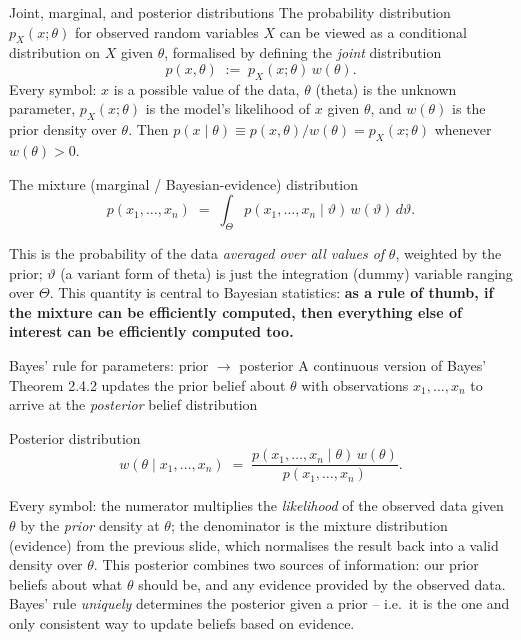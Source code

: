 \documentclass[aspectratio=169,10pt]{beamer}
\begin{document}
\begin{frame}{Joint, marginal, and posterior distributions}
  The probability distribution $p_X(x;\theta)$ for observed random variables
  $X$ can be viewed as a conditional distribution on $X$ given $\theta$,
  formalised by defining the \emph{joint} distribution
  \[
    p(x,\theta) \;:=\; p_X(x;\theta)\,w(\theta).
  \]
  Every symbol: $x$ is a possible value of the data, $\theta$ (theta) is the
  unknown parameter, $p_X(x;\theta)$ is the model's likelihood of $x$ given
  $\theta$, and $w(\theta)$ is the prior density over $\theta$. Then
  $p(x\mid\theta)\equiv p(x,\theta)/w(\theta)=p_X(x;\theta)$ whenever
  $w(\theta)>0$.

  \begin{block}{The mixture (marginal / Bayesian-evidence) distribution}
    \[
      p(x_1,\ldots,x_n) \;=\; \int_\Theta p(x_1,\ldots,x_n\mid\vartheta)\,w(\vartheta)\,d\vartheta.
    \]
  \end{block}
  This is the probability of the data \emph{averaged over all values of}
  $\theta$, weighted by the prior; $\vartheta$ (a variant form of theta) is
  just the integration (dummy) variable ranging over $\Theta$. This
  quantity is central to Bayesian statistics: \textbf{as a rule of thumb, if
  the mixture can be efficiently computed, then everything else of interest
  can be efficiently computed too.}
\end{frame}

\begin{frame}{Bayes' rule for parameters: prior $\to$ posterior}
  A continuous version of Bayes' Theorem 2.4.2 updates the prior belief
  about $\theta$ with observations $x_1,\ldots,x_n$ to arrive at the
  \emph{posterior} belief distribution
  \begin{block}{Posterior distribution}
    \[
      w(\theta\mid x_1,\ldots,x_n) \;=\; \frac{p(x_1,\ldots,x_n\mid\theta)\,w(\theta)}{p(x_1,\ldots,x_n)}.
    \]
  \end{block}
  Every symbol: the numerator multiplies the \emph{likelihood} of the
  observed data given $\theta$ by the \emph{prior} density at $\theta$; the
  denominator is the mixture distribution (evidence) from the previous
  slide, which normalises the result back into a valid density over
  $\theta$. This posterior combines two sources of information: our prior
  beliefs about what $\theta$ should be, and any evidence provided by the
  observed data. Bayes' rule \emph{uniquely} determines the posterior given
  a prior -- i.e.\ it is the one and only consistent way to update beliefs
  based on evidence.
\end{frame}
\end{document}
